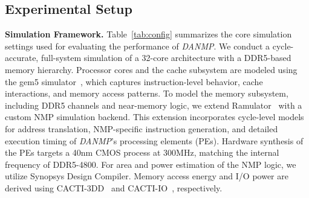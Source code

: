 \documentclass[sigconf]{acmart}
\begin{document}
\subsection{Experimental Setup}
\label{exp_setup}
{\bf Simulation Framework.} Table~\ref{tab:config} summarizes the core simulation settings used for evaluating the performance of \textit{DANMP}. We conduct a cycle-accurate, full-system simulation of a 32-core architecture with a DDR5-based memory hierarchy. Processor cores and the cache subsystem are modeled using the gem5 simulator~\cite{gem5}, which captures instruction-level behavior, cache interactions, and memory access patterns. To model the memory subsystem, including DDR5 channels and near-memory logic, we extend Ramulator~\cite{ramulator2015} with a custom NMP simulation backend. This extension incorporates cycle-level models for address translation, NMP-specific instruction generation, and detailed execution timing of \textit{DANMP}'s processing elements (PEs). Hardware synthesis of the PEs targets a 40nm CMOS process at 300MHz, matching the internal frequency of DDR5-4800. For area and power estimation of the NMP logic, we utilize Synopsys Design Compiler. Memory access energy and I/O power are derived using CACTI-3DD~\cite{CACTI-3DD} and CACTI-IO~\cite{CACTI-IO}, respectively. 
\end{document}

